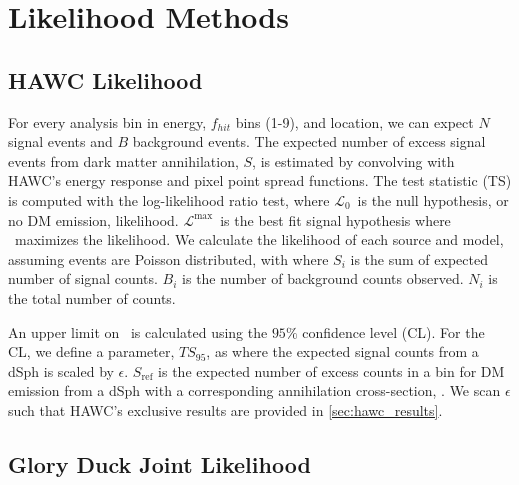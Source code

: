 \clearpage\pagestyle{lscape}

\pagestyle{plain}

\clearpage


\section{Likelihood Methods} \label{sec:gd_ll_methods}

\subsection{HAWC Likelihood}\label{sec:gd_hawc_llh}

For every analysis bin in energy, $f_{hit}$ bins (1-9), and location, we can expect $N$ signal events and $B$ background events.
The expected number of excess signal events from dark matter annihilation, $S$, is estimated by convolving  with HAWC's energy response and pixel point spread functions.
The test statistic (TS) is computed with the log-likelihood ratio test,
\gdTS
where $\mathcal{L}_0$~is the null hypothesis, or no DM emission, likelihood.
$\mathcal{L}^\mathrm{max}$~is the best fit signal hypothesis where \sv~maximizes the likelihood.
We calculate the likelihood of each source and model, assuming events are Poisson distributed, with
\hwcpsLLH
where $S_i$ is the sum of expected number of signal counts.
$B_i$ is the number of background counts observed.
$N_i$ is the total number of counts.

An upper limit on \sv~is calculated using the $95\%$ confidence level (CL).
For the CL, we define a parameter, $TS_{95}$, as
\gdHAWCCL
where the expected signal counts from a dSph is scaled by $\epsilon$.
$S_\mathrm{ref}$ is the expected number of excess counts in a bin for DM emission from a dSph with a corresponding annihilation cross-section, \sv.
We scan $\epsilon$ such that
\CLbyTS
HAWC's exclusive results are provided in \cref{sec:hawc_results}.

\subsection{Glory Duck Joint Likelihood}\label{sec:gd_joint_llh}

